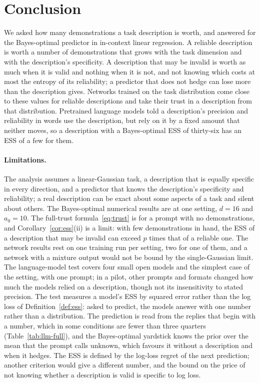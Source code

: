 \documentclass{article}
\begin{document}
\section{Conclusion}
We asked how many demonstrations a task description is worth, and answered for the Bayes-optimal predictor in in-context linear regression. A reliable description is worth a number of demonstrations that grows with the task dimension and with the description's specificity. A description that may be invalid is worth as much when it is valid and nothing when it is not, and not knowing which costs at most the entropy of its reliability; a predictor that does not hedge can lose more than the description gives. Networks trained on the task distribution come close to these values for reliable descriptions and take their trust in a description from that distribution. Pretrained language models told a description's precision and reliability in words use the description, but rely on it by a fixed amount that neither moves, so a description with a Bayes-optimal ESS of thirty-six has an ESS of a few for them.

\paragraph{Limitations.} The analysis assumes a linear-Gaussian task, a description that is equally specific in every direction, and a predictor that knows the description's specificity and reliability; a real description can be exact about some aspects of a task and silent about others. The Bayes-optimal numerical results are at one setting, $d = 16$ and $a_0 = 10$. The full-trust formula~\eqref{eq:trust} is for a prompt with no demonstrations, and Corollary~\ref{cor:ess}(ii) is a limit: with few demonstrations in hand, the ESS of a description that may be invalid can exceed $p$ times that of a reliable one. The network results rest on one training run per setting, two for one of them, and a network with a mixture output would not be bound by the single-Gaussian limit. The language-model test covers four small open models and the simplest case of the setting, with one prompt; in a pilot, other prompts and formats changed how much the models relied on a description, though not its insensitivity to stated precision. The test measures a model's ESS by squared error rather than the log loss of Definition~\ref{def:ess}: asked to predict, the models answer with one number rather than a distribution. The prediction is read from the replies that begin with a number, which in some conditions are fewer than three quarters (Table~\ref{tab:llm-full}), and the Bayes-optimal yardstick knows the prior over the mean that the prompt calls unknown, which favours it without a description and when it hedges. The ESS is defined by the log-loss regret of the next prediction; another criterion would give a different number, and the bound on the price of not knowing whether a description is valid is specific to log loss.
\end{document}
